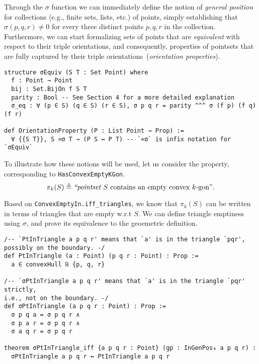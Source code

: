 Through the $\sigma$ function we can immediately define the notion of \emph{general position} for collections (e.g., finite sets, lists, etc.) of points, simply establishing that $\sigma(p, q, r) \neq 0$ for every three distinct points $p, q, r$ in the collection.
Furthermore, we can start formalizing sets of points that are \emph{equivalent} with respect to their triple orientations, and consequently, properties of pointsets that are fully captured by their triple orientations~(\emph{orientation properties}).
% 
\begin{lstlisting}
structure σEquiv (S T : Set Point) where
  f : Point → Point
  bij : Set.BijOn f S T
  parity : Bool -- See Section 4 for a more detailed explanation
  σ_eq : ∀ (p ∈ S) (q ∈ S) (r ∈ S), σ p q r = parity ^^^ σ (f p) (f q) (f r)

def OrientationProperty (P : List Point → Prop) :=
  ∀ {{S T}}, S ≃σ T → (P S ↔ P T) -- `≃σ` is infix notation for `σEquiv`
\end{lstlisting}

To illustrate how these notions will be used, let us consider the property, corresponding to \lstinline|HasConvexEmptyKGon|.
\[
  \pi_k(S) \triangleq \text{\em ``pointset } S \text{ contains an empty convex } k\text{-gon''}.
\]

Based on \lstinline|ConvexEmptyIn.iff_triangles|, we know that $\pi_k(S)$ can be written in terms of triangles that are empty w.r.t $S$. We can define triangle emptiness using $\sigma$, and prove its equivalence to the geoemetric definition.
\begin{lstlisting}
/-- `PtInTriangle a p q r' means that `a' is in the triangle `pqr',
possibly on the boundary. -/
def PtInTriangle (a : Point) (p q r : Point) : Prop :=
  a ∈ convexHull ℝ {p, q, r}

/-- `σPtInTriangle a p q r' means that `a' is in the triangle `pqr' strictly,
i.e., not on the boundary. -/
def σPtInTriangle (a p q r : Point) : Prop :=
  σ p q a = σ p q r ∧
  σ p a r = σ p q r ∧
  σ a q r = σ p q r

theorem σPtInTriangle_iff {a p q r : Point} (gp : InGenPos₄ a p q r) :
  σPtInTriangle a p q r ↔ PtInTriangle a p q r
\end{lstlisting}



